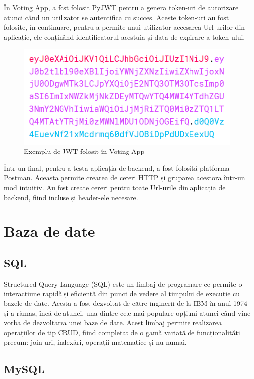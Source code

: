 În Voting App, a fost folosit PyJWT pentru a genera token-uri de autorizare atunci când un utilizator se autentifica cu succes. Aceste token-uri au fost folosite, în continuare, pentru a permite unui utilizator accesarea Url-urilor din aplicație, ele conținând identificatorul acestuia și data de expirare a token-ului.

\begin{figure}[!h]
    \centering
    \includegraphics[width=110mm]{images/jwt_example.png}
    \caption{Exemplu de JWT folosit în Voting App}
\end{figure}

Într-un final, pentru a testa aplicația de backend, a fost folosită platforma Postman. Aceasta permite crearea de cereri HTTP și gruparea acestora într-un mod intuitiv. Au fost create cereri pentru toate Url-urile din aplicația de backend, fiind incluse și header-ele necesare.

\section{Baza de date}

\subsection{SQL}

Structured Query Language (SQL) este un limbaj de programare ce permite o interacțiune rapidă și eficientă din punct de vedere al timpului de execuție cu bazele de date. Acesta a fost dezvoltat de către inginerii de la IBM în anul 1974 și a rămas, încă de atunci, una dintre cele mai populare opțiuni atunci când vine vorba de dezvoltarea unei baze de date. Acest limbaj permite realizarea operațiilor de tip CRUD, fiind completat de o gamă variată de funcționalități precum: join-uri, indexări, operații matematice și nu numai.

\subsection{MySQL}

